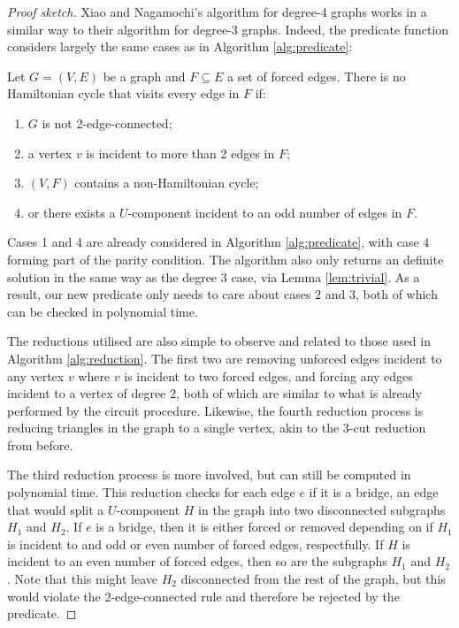 \begin{proof}[Proof sketch]
Xiao and Nagamochi's algorithm for degree-4 graphs works in a similar way to their algorithm for degree-3 graphs. Indeed, the predicate function considers largely the same cases as in Algorithm \ref{alg:predicate}:

\begin{lemma}Let $G=(V,E)$ be a graph and $F\subseteq E$ a set of forced edges. There is no Hamiltonian cycle that visits every edge in $F$ if:

\begin{enumerate}
\item $G$ is not 2-edge-connected;
\item a vertex $v$ is incident to more than 2 edges in $F$;
\item $(V, F)$ contains a non-Hamiltonian cycle;
\item or there exists a $U$-component incident to an odd number of edges in $F$.
\end{enumerate}
\end{lemma}

Cases 1 and 4 are already considered in Algorithm \ref{alg:predicate}, with case $4$ forming part of the parity condition. The algorithm also only returns an definite solution in the same way as the degree $3$ case, via Lemma \ref{lem:trivial}. As a result, our new predicate only needs to care about cases $2$ and $3$, both of which can be checked in polynomial time.

The reductions utilised are also simple to observe and related to those used in Algorithm \ref{alg:reduction}. The first two are removing unforced edges incident to any vertex $v$ where $v$ is incident to two forced edges, and forcing any edges incident to a vertex of degree 2, both of which are similar to what is already performed by the circuit procedure. Likewise, the fourth reduction process is reducing triangles in the graph to a single vertex, akin to the 3-cut reduction from before.

The third reduction process is more involved, but can still be computed in polynomial time. This reduction checks for each edge $e$ if it is a bridge, an edge that would split a $U$-component $H$ in the graph into two disconnected subgraphs $H_1$ and $H_2$. If $e$ is a bridge, then it is either forced or removed depending on if $H_1$ is incident to and odd or even number of forced edges, respectfully. If $H$ is incident to an even number of forced edges, then so are the subgraphs $H_1$ and $H_2$. Note that this might leave $H_2$ disconnected from the rest of the graph, but this would violate the 2-edge-connected rule and therefore be rejected by the predicate.


\end{proof}
